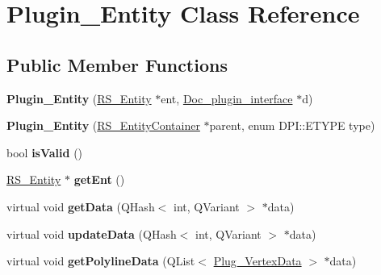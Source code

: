 \hypertarget{classPlugin__Entity}{\section{Plugin\-\_\-\-Entity Class Reference}
\label{classPlugin__Entity}
}
\subsection*{Public Member Functions}
\begin{DoxyCompactItemize}
\item 
\hypertarget{classPlugin__Entity_ad9c05fb5891c4be2be5ee6f5a0aa291b}{{\bfseries Plugin\-\_\-\-Entity} (\hyperlink{classRS__Entity}{R\-S\-\_\-\-Entity} $\ast$ent, \hyperlink{classDoc__plugin__interface}{Doc\-\_\-plugin\-\_\-interface} $\ast$d)}\label{classPlugin__Entity_ad9c05fb5891c4be2be5ee6f5a0aa291b}

\item 
\hypertarget{classPlugin__Entity_af3f8aeb6f7941f052ff79d5dc8c37d8c}{{\bfseries Plugin\-\_\-\-Entity} (\hyperlink{classRS__EntityContainer}{R\-S\-\_\-\-Entity\-Container} $\ast$parent, enum D\-P\-I\-::\-E\-T\-Y\-P\-E type)}\label{classPlugin__Entity_af3f8aeb6f7941f052ff79d5dc8c37d8c}

\item 
\hypertarget{classPlugin__Entity_a200c2d7ee82167bd5131db8c53e1c64c}{bool {\bfseries is\-Valid} ()}\label{classPlugin__Entity_a200c2d7ee82167bd5131db8c53e1c64c}

\item 
\hypertarget{classPlugin__Entity_a4ac9c3175609df5ca6abf0bbee79f81b}{\hyperlink{classRS__Entity}{R\-S\-\_\-\-Entity} $\ast$ {\bfseries get\-Ent} ()}\label{classPlugin__Entity_a4ac9c3175609df5ca6abf0bbee79f81b}

\item 
\hypertarget{classPlugin__Entity_aa644aa6c01ccb941b15d20060ba05549}{virtual void {\bfseries get\-Data} (Q\-Hash$<$ int, Q\-Variant $>$ $\ast$data)}\label{classPlugin__Entity_aa644aa6c01ccb941b15d20060ba05549}

\item 
\hypertarget{classPlugin__Entity_ad11962e73955b53ba7abc5e25eafc99b}{virtual void {\bfseries update\-Data} (Q\-Hash$<$ int, Q\-Variant $>$ $\ast$data)}\label{classPlugin__Entity_ad11962e73955b53ba7abc5e25eafc99b}

\item 
\hypertarget{classPlugin__Entity_a0d16275a713e87ef0382abffa6c40b50}{virtual void {\bfseries get\-Polyline\-Data} (Q\-List$<$ \hyperlink{classPlug__VertexData}{Plug\-\_\-\-Vertex\-Data} $>$ $\ast$data)}\label{classPlugin__Entity_a0d16275a713e87ef0382abffa6c40b50}


\end{DoxyCompactItemize}
